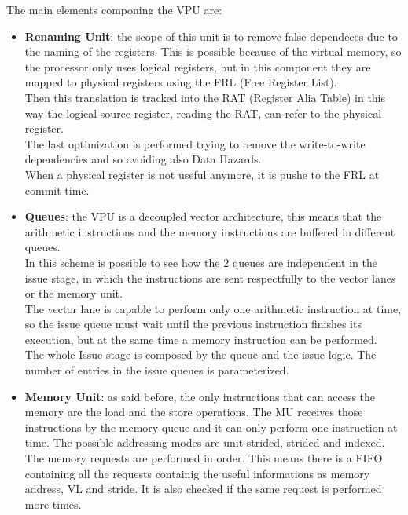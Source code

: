 The main elements componing the VPU are:
\begin{itemize}
    \item \textbf{Renaming Unit}: the scope of this unit is to remove false dependeces due to the naming of the registers. This is possible because of the virtual memory, so the processor only uses logical registers, but in this component they are mapped to physical registers using the FRL (Free Register List).\\
    Then this translation is tracked into the RAT (Register Alia Table) in this way the logical source register, reading the RAT, can refer to the physical register.\\
    The last optimization is performed trying to remove the write-to-write dependencies and so avoiding also Data Hazards.\\
    When a physical register is not useful anymore, it is pushe to the FRL at commit time.
 
    \item \textbf{Queues}: the VPU is a decoupled vector architecture, this means that the arithmetic instructions and the memory instructions are buffered in different queues.\\
    In this scheme is possible to see how the 2 queues are independent in the issue stage, in which the instructions are sent respectfully to the vector lanes or the memory unit.\\
    The vector lane is capable to perform only one arithmetic instruction at time, so the issue queue must wait  until the previous instruction finishes its execution, but at the same time a memory instruction can be performed.\\
    The whole Issue stage is composed by the queue and the issue logic. The number of entries in the issue queues is parameterized.
    
    \item \textbf{Memory Unit}: as said before, the only instructions that can access the memory are the load and the store operations. The MU receives those instructions by the memory queue and it can only perform one instruction at time. 
    The possible addressing modes are unit-strided, strided and indexed.\\
    
    The memory requests are performed in order. This means there is a FIFO containing all the requests containig the useful informations as memory address, VL and stride.
    It is also checked if the same request is performed more times.\\


\end{itemize}
